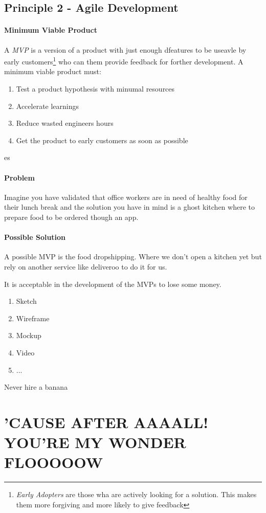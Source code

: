 \documentclass{article}
\begin{document}
\subsection{Principle 2 - Agile Development}
\paragraph{Minimum Viable Product}
A \textit{MVP} is a version of a product with just enough dfeatures to be useavle by early customers\footnote{\textit{Early Adopters} are those wha are actively looking for a solution. This makes them more forgiving and more likely to give feedback} who can them provide feedback for forther development. 
A minimum viable product must: \begin{enumerate}
    \item Test a product hypothesis with minumal resources
    \item Accelerate learnings
    \item Reduce wasted engineers hours
    \item Get the product to early customers as soon as possible
\end{enumerate}

\begin{esempio}{es}
    \paragraph{Problem}
    Imagine you have validated that office workers are in need of healthy food for their lunch break and the solution you have in mind is a ghost kitchen where to prepare food to be ordered though an app.
    \paragraph{Possible Solution}
    A possible MVP is the food dropshipping. Where we don't open a kitchen yet but rely on another service like deliveroo to do it for us. 
\end{esempio}

It is acceptable in the development of the MVPs to lose some money.

\begin{enumerate}
    \item Sketch
    \item Wireframe
    \item Mockup
    \item Video
    \item ...
\end{enumerate}

\begin{warning}{Never hire a banana}
\end{warning}


\section{'CAUSE AFTER AAAALL! YOU'RE MY WONDER FLOOOOOW}
\end{document}
